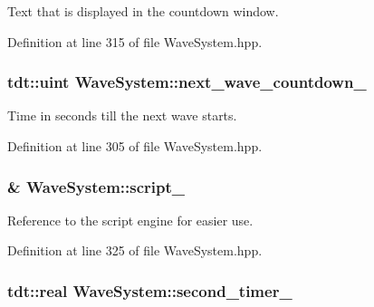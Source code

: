 Text that is displayed in the countdown window. 



Definition at line 315 of file Wave\+System.\+hpp.

\subsubsection[{\texorpdfstring{next\+\_\+wave\+\_\+countdown\+\_\+}{next_wave_countdown_}}]{\setlength{\rightskip}{0pt plus 5cm}tdt\+::uint Wave\+System\+::next\+\_\+wave\+\_\+countdown\+\_\+\hspace{0.3cm}{\ttfamily [private]}}\hypertarget{class_wave_system_ae70ca36a66a8df6d356539c7e0cc0e19}{}\label{class_wave_system_ae70ca36a66a8df6d356539c7e0cc0e19}


Time in seconds till the next wave starts. 



Definition at line 305 of file Wave\+System.\+hpp.

\subsubsection[{\texorpdfstring{script\+\_\+}{script_}}]{\& Wave\+System\+::script\+\_\+\hspace{0.3cm}{\ttfamily [private]}}\hypertarget{class_wave_system_a0a4f867a7e8179bb77235e4d66bdc67e}{}\label{class_wave_system_a0a4f867a7e8179bb77235e4d66bdc67e}


Reference to the script engine for easier use. 



Definition at line 325 of file Wave\+System.\+hpp.

\subsubsection[{\texorpdfstring{second\+\_\+timer\+\_\+}{second_timer_}}]{\setlength{\rightskip}{0pt plus 5cm}tdt\+::real Wave\+System\+::second\+\_\+timer\+\_\+\hspace{0.3cm}{\ttfamily [private]}}\hypertarget{class_wave_system_a9d249d2778d8f7a618274bcc6b8ed3aa}{}\label{class_wave_system_a9d249d2778d8f7a618274bcc6b8ed3aa}


